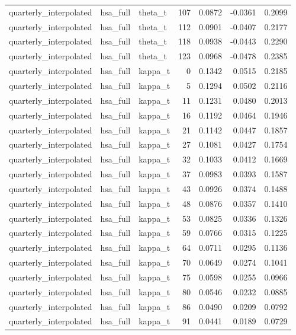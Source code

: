 \begin{tabular}{lllrrrr}
quarterly\_interpolated & hsa\_full & theta\_t & 107 & 0.0872 & -0.0361 & 0.2099 \\
quarterly\_interpolated & hsa\_full & theta\_t & 112 & 0.0901 & -0.0407 & 0.2177 \\
quarterly\_interpolated & hsa\_full & theta\_t & 118 & 0.0938 & -0.0443 & 0.2290 \\
quarterly\_interpolated & hsa\_full & theta\_t & 123 & 0.0968 & -0.0478 & 0.2385 \\
quarterly\_interpolated & hsa\_full & kappa\_t & 0 & 0.1342 & 0.0515 & 0.2185 \\
quarterly\_interpolated & hsa\_full & kappa\_t & 5 & 0.1294 & 0.0502 & 0.2116 \\
quarterly\_interpolated & hsa\_full & kappa\_t & 11 & 0.1231 & 0.0480 & 0.2013 \\
quarterly\_interpolated & hsa\_full & kappa\_t & 16 & 0.1192 & 0.0464 & 0.1946 \\
quarterly\_interpolated & hsa\_full & kappa\_t & 21 & 0.1142 & 0.0447 & 0.1857 \\
quarterly\_interpolated & hsa\_full & kappa\_t & 27 & 0.1081 & 0.0427 & 0.1754 \\
quarterly\_interpolated & hsa\_full & kappa\_t & 32 & 0.1033 & 0.0412 & 0.1669 \\
quarterly\_interpolated & hsa\_full & kappa\_t & 37 & 0.0983 & 0.0393 & 0.1587 \\
quarterly\_interpolated & hsa\_full & kappa\_t & 43 & 0.0926 & 0.0374 & 0.1488 \\
quarterly\_interpolated & hsa\_full & kappa\_t & 48 & 0.0876 & 0.0357 & 0.1410 \\
quarterly\_interpolated & hsa\_full & kappa\_t & 53 & 0.0825 & 0.0336 & 0.1326 \\
quarterly\_interpolated & hsa\_full & kappa\_t & 59 & 0.0766 & 0.0315 & 0.1225 \\
quarterly\_interpolated & hsa\_full & kappa\_t & 64 & 0.0711 & 0.0295 & 0.1136 \\
quarterly\_interpolated & hsa\_full & kappa\_t & 70 & 0.0649 & 0.0274 & 0.1041 \\
quarterly\_interpolated & hsa\_full & kappa\_t & 75 & 0.0598 & 0.0255 & 0.0966 \\
quarterly\_interpolated & hsa\_full & kappa\_t & 80 & 0.0546 & 0.0232 & 0.0885 \\
quarterly\_interpolated & hsa\_full & kappa\_t & 86 & 0.0490 & 0.0209 & 0.0792 \\
quarterly\_interpolated & hsa\_full & kappa\_t & 91 & 0.0441 & 0.0189 & 0.0729 \\

\end{tabular}

